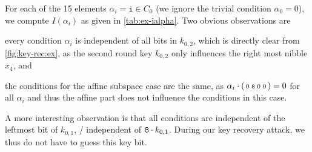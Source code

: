 \begin{example}
\begin{description}
            For each of the 15 elements $\alpha_i = \mathtt{i} \in C_0$ (we ignore the trivial condition $\alpha_0 = 0$), we compute $I(\alpha_i)$ as given in \cref{tab:ex-ialpha}.
            Two obvious observations are \begin{inparaenum}
            \item every condition $\alpha_i$ is independent of all bits in $k_{0,2}$, which is directly clear from \cref{fig:key-rec:ex}, as the second round key $k_{0,2}$ only influences the right most nibble $x_4$, and
            \item the conditions for the affine subspace case are the same, as $\alpha_i \cdot \begin{psmallmatrix} 0 & \mathtt{8} & 0 & 0 \end{psmallmatrix} = 0$ for all $\alpha_i$ and thus the affine part does not influence the conditions in this case.
            \end{inparaenum}

            A more interesting observation is that all conditions are independent of the leftmost bit of $k_{0,1}$, \ie/ independent of $\mathtt{8} \cdot k_{0,1}$.
            During our key recovery attack, we thus do not have to guess this key bit.
    \end{description}
\end{example}
